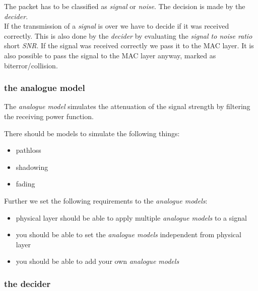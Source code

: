 The packet has to be classified as \textit{signal} or \textit{noise}. The decision is made by the \textit{decider}.\\

If the transmission of a \textit{signal} is over we have to decide if it was received correctly. This is also done by the \textit{decider} by evaluating the \textit{signal to noise ratio} short \textit{SNR}. 
If the signal was received correctly we pass it to the MAC layer. It is also possible to pass the signal to the MAC layer anyway, marked as biterror/collision.

\subsubsection{the analogue model}
\label{analogueModel}

The \textit{analogue model} simulates the attenuation of the signal strength by filtering the receiving power function.

There should be models to simulate the following things:

\begin{itemize}
 \item pathloss
 \item shadowing
 \item fading
\end{itemize}

Further we set the following requirements to the \textit{analogue models}:

\begin{itemize}
 \item physical layer should be able to apply multiple \textit{analogue models} to a signal
 \item you should be able to set the \textit{analogue models} independent from physical layer
 \item you should be able to add your own \textit{analogue models}
\end{itemize}

\subsubsection{the decider}
\label{decider}

